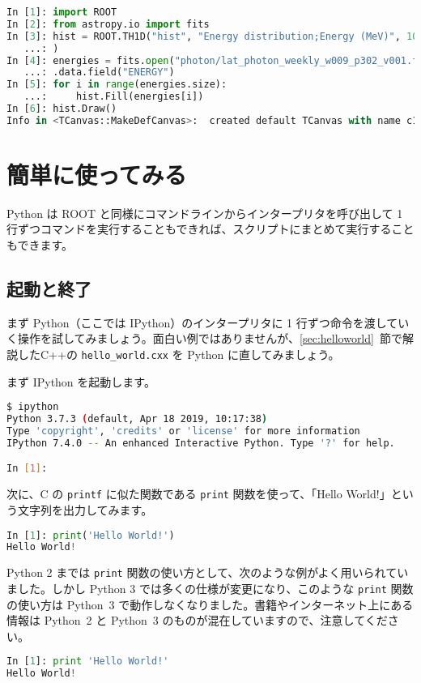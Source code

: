 \begin{lstlisting}[language=python]
In [1]: import ROOT
In [2]: from astropy.io import fits 
In [3]: hist = ROOT.TH1D("hist", "Energy distribution;Energy (MeV)", 100, 0, 1e3
   ...: )
In [4]: energies = fits.open("photon/lat_photon_weekly_w009_p302_v001.fits")[1]
   ...: .data.field("ENERGY")
In [5]: for i in range(energies.size):
   ...:     hist.Fill(energies[i])
In [6]: hist.Draw()
Info in <TCanvas::MakeDefCanvas>:  created default TCanvas with name c1
\end{lstlisting}

\section{簡単に使ってみる}
Python は ROOT と同様にコマンドラインからインタープリタを呼び出して 1 行ずつコマンドを実行することもできれば、スクリプトにまとめて実行することもできます。

\subsection{起動と終了}
まず Python（ここでは IPython）のインタープリタに 1 行ずつ命令を渡していく操作を試してみましょう。面白い例ではありませんが、\ref{sec:helloworld}~節で解説したC++の \texttt{hello\_world.cxx} を Python に直してみましょう。

まず IPython を起動します。

\begin{lstlisting}[language=bash]
$ ipython
Python 3.7.3 (default, Apr 18 2019, 10:17:38) 
Type 'copyright', 'credits' or 'license' for more information
IPython 7.4.0 -- An enhanced Interactive Python. Type '?' for help.

In [1]: 
\end{lstlisting}

次に、C の \texttt{printf} に似た関数である \texttt{print} 関数を使って、「Hello World!」という文字列を出力してみます。
\begin{lstlisting}[language=python]
In [1]: print('Hello World!')
Hello World!
\end{lstlisting}

Python 2 までは \texttt{print} 関数の使い方として、次のような例がよく用いられていました。しかし Python 3 では多くの仕様が変更になり、このような \texttt{print} 関数の使い方は Python~3 で動作しなくなりました。書籍やインターネット上にある情報は Python~2 と Python~3 のものが混在していますので、注意してください。

\begin{lstlisting}[language=python]
In [1]: print 'Hello World!'
Hello World!
\end{lstlisting}

